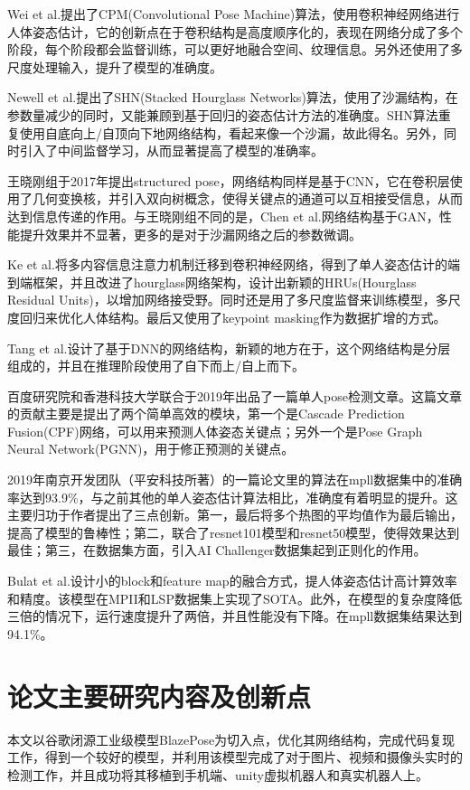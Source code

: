 Wei et al.提出了CPM(Convolutional Pose Machine)算法，使用卷积神经网络进行人体姿态估计，它的创新点在于卷积结构是高度顺序化的，表现在网络分成了多个阶段，每个阶段都会监督训练，可以更好地融合空间、纹理信息。另外还使用了多尺度处理输入，提升了模型的准确度。

Newell et al.提出了SHN(Stacked Hourglass Networks)算法，使用了沙漏结构，在参数量减少的同时，又能兼顾到基于回归的姿态估计方法的准确度。SHN算法重复使用自底向上/自顶向下地网络结构，看起来像一个沙漏，故此得名。另外，同时引入了中间监督学习，从而显著提高了模型的准确率。

王晓刚组于2017年提出structured pose\cite{chu2016structured}，网络结构同样是基于CNN，它在卷积层使用了几何变换核，并引入双向树概念，使得关键点的通道可以互相接受信息，从而达到信息传递的作用。与王晓刚组不同的是，Chen et al.网络结构基于GAN，性能提升效果并不显著，更多的是对于沙漏网络之后的参数微调。

Ke et al.将多内容信息注意力机制迁移到卷积神经网络，得到了单人姿态估计的端到端框架，并且改进了hourglass网络架构，设计出新颖的HRUs(Hourglass Residual Units)，以增加网络接受野。同时还是用了多尺度监督来训练模型，多尺度回归来优化人体结构。最后又使用了keypoint masking作为数据扩增的方式。

Tang et al.设计了基于DNN的网络结构，新颖的地方在于，这个网络结构是分层组成的，并且在推理阶段使用了自下而上/自上而下。

百度研究院和香港科技大学联合于2019年出品了一篇单人pose检测文章\cite{zhang2019human}。这篇文章的贡献主要是提出了两个简单高效的模块，第一个是Cascade Prediction Fusion(CPF)网络，可以用来预测人体姿态关键点；另外一个是Pose Graph Neural Network(PGNN)，用于修正预测的关键点。

2019年南京开发团队（平安科技所著）的一篇论文\cite{su2019cascade}里的算法在mpll数据集中的准确率达到93.9\%，与之前其他的单人姿态估计算法相比，准确度有着明显的提升。这主要归功于作者提出了三点创新。第一，最后将多个热图的平均值作为最后输出，提高了模型的鲁棒性；第二，联合了resnet101模型和resnet50模型，使得效果达到最佳；第三，在数据集方面，引入AI Challenger数据集起到正则化的作用。

Bulat et al.设计小的block和feature map的融合方式，提人体姿态估计高计算效率和精度。该模型在MPII和LSP数据集上实现了SOTA。此外，在模型的复杂度降低三倍的情况下，运行速度提升了两倍，并且性能没有下降。在mpll数据集结果达到94.1\%。

\section{论文主要研究内容及创新点}
本文以谷歌闭源工业级模型BlazePose为切入点，优化其网络结构，完成代码复现工作，得到一个较好的模型，并利用该模型完成了对于图片、视频和摄像头实时的检测工作，并且成功将其移植到手机端、unity虚拟机器人和真实机器人上。

